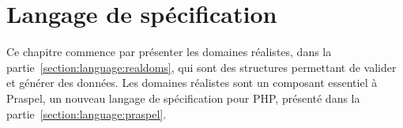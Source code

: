 \chapter{Langage de spécification}
\label{chapter:language}

\mminitoc

Ce chapitre commence par présenter les domaines réalistes, dans la
partie~\ref{section:language:realdoms}, qui sont des structures permettant de
valider et générer des données. Les domaines réalistes sont un composant
essentiel à Praspel, un nouveau langage de spécification pour PHP, présenté dans
la partie~\ref{section:language:praspel}.

